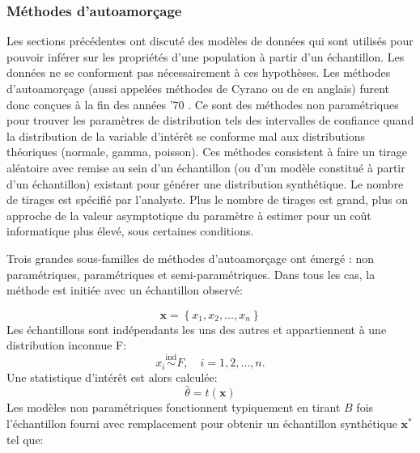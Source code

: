         \subsubsection{Méthodes d'autoamorçage}\label{ssec:autoamorçage}
            Les sections précédentes ont discuté des modèles de données qui sont utilisés pour pouvoir inférer sur les propriétés d'une population à partir d'un échantillon. Les données ne se conforment pas nécessairement à ces hypothèses. Les méthodes d'autoamorçage (aussi appelées méthodes de Cyrano ou de \fg{} en anglais) furent donc conçues à la fin des années '70 \parencite{efron_bootstrap_1979,miller_jackknife_1974}. Ce sont des méthodes non paramétriques pour trouver les paramètres de distribution tels des intervalles de confiance quand la distribution de la variable d'intérêt se conforme mal aux distributions théoriques (normale, gamma, poisson). Ces méthodes consistent à faire un tirage aléatoire avec remise au sein d'un échantillon (ou d'un modèle constitué à partir d'un échantillon) existant pour générer une distribution synthétique. Le nombre de tirages est spécifié par l'analyste. Plus le nombre de tirages est grand, plus on approche de la valeur asymptotique du paramètre à estimer pour un coût  informatique plus élevé, sous certaines conditions. \par
            Trois grandes sous-familles de méthodes d'autoamorçage ont émergé \parencite{davison_bootstrap_1999}: non paramétriques, paramétriques et semi-paramétriques. Dans tous les cas, la méthode est initiée avec un échantillon observé:\par
            \begin{equation}
                \mathbf{x} = \left\{ x_1,x_2,\ldots,x_n\right\}
            \end{equation}
            Les échantillons sont indépendants les uns des autres et appartiennent à une distribution inconnue F:
            \begin{equation}
                x_i \stackrel{\text{ind}}{\sim} F, \quad i = 1, 2, \dots, n.
            \end{equation}
            Une statistique d'intérêt est alors calculée: 
            \begin{equation}
                \hat\theta = t(\mathbf{x})
            \end{equation}
            Les modèles non paramétriques fonctionnent typiquement en tirant $B$ fois l'échantillon fourni avec remplacement pour obtenir un échantillon synthétique $\mathbf{x}^*$ tel que:
